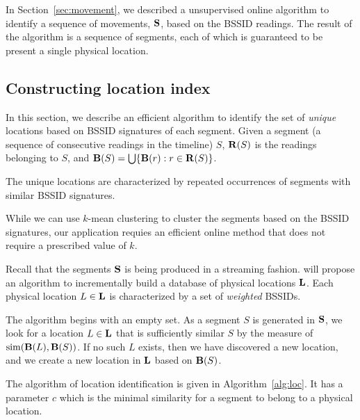 In Section~\ref{sec:movement}, we described a unsupervised online algorithm to
identify a sequence of movements, $\mathbf{S}$, based on the BSSID readings.  The result of the
algorithm is a sequence of segments, each of which is guaranteed to be present a
single physical location.

\subsection{Constructing location index}

In this section, we describe an efficient algorithm to identify the set of {\em
unique} locations based on BSSID signatures of each segment.  Given a segment (a
sequence of consecutive readings in the timeline) $S$, $\mathbf{R}(S)$ is the readings
belonging to $S$, and $\mathbf{B}(S) = \bigcup\{\mathbf{B}(r): r\in\mathbf{R}(S)\}$.

The unique locations are characterized by repeated occurrences of segments with
similar BSSID signatures.

While we can use $k$-mean clustering to cluster the segments based on the BSSID
signatures, our application requies an efficient online method that does not
require a prescribed value of $k$.

Recall that the segments $\mathbf{S}$ is being produced in a streaming fashion.  will
propose an algorithm to incrementally build a database of physical locations
$\mathbf{L}$.  Each physical location $L\in\mathbf{L}$ is characterized by a set of {\em
weighted} BSSIDs.

The algorithm begins with an empty set.  As a segment $S$ is generated in $\mathbf{S}$, we
look for a location $L\in\mathbf{L}$ that is sufficiently similar $S$ by the measure
of $\mathrm{sim}(\mathbf{B}(L), \mathbf{B}(S))$.  If no such $L$ exists, then we have
discovered a new location, and we create a new location in $\mathbf{L}$ based on $\mathbf{B}(S)$.

The algorithm of location identification is given in Algorithm~\ref{alg:loc}.
It has a parameter $c$ which is the minimal similarity for a segment to belong
to a physical location.

